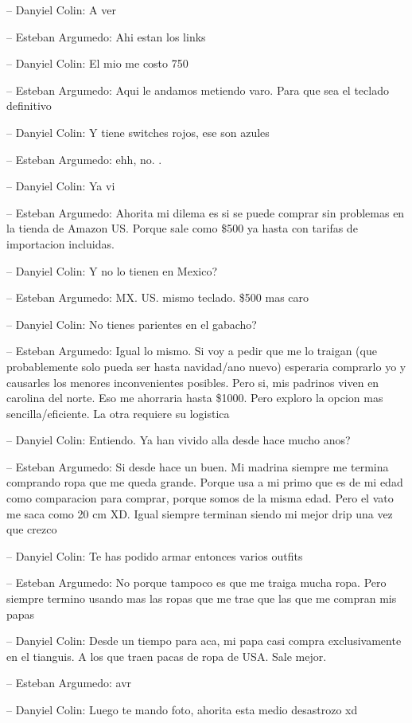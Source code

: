 -- Danyiel Colin: A ver

-- Esteban Argumedo: Ahi estan los links

-- Danyiel Colin: El mio me costo 750

-- Esteban Argumedo: Aqui le andamos metiendo varo. Para que sea el
teclado definitivo

-- Danyiel Colin: Y tiene switches rojos, ese son azules

-- Esteban Argumedo: ehh, no. .

-- Danyiel Colin: Ya vi

-- Esteban Argumedo: Ahorita mi dilema es si se puede comprar sin
problemas en la tienda de Amazon US. Porque sale como \$500 ya hasta con
tarifas de importacion incluidas.

-- Danyiel Colin: Y no lo tienen en Mexico?

-- Esteban Argumedo: MX. US. mismo teclado. \$500 mas caro

-- Danyiel Colin: No tienes parientes en el gabacho?

-- Esteban Argumedo: Igual lo mismo. Si voy a pedir que me lo traigan
(que probablemente solo pueda ser hasta navidad/ano nuevo) esperaria
comprarlo yo y causarles los menores inconvenientes posibles. Pero si,
mis padrinos viven en carolina del norte. Eso me ahorraria hasta \$1000.
Pero exploro la opcion mas sencilla/eficiente. La otra requiere su
logistica

-- Danyiel Colin: Entiendo. Ya han vivido alla desde hace mucho anos?

-- Esteban Argumedo: Si desde hace un buen. Mi madrina siempre me
termina comprando ropa que me queda grande. Porque usa a mi primo que es
de mi edad como comparacion para comprar, porque somos de la misma edad.
Pero el vato me saca como 20 cm XD. Igual siempre terminan siendo mi
mejor drip una vez que crezco

-- Danyiel Colin: Te has podido armar entonces varios outfits

-- Esteban Argumedo: No porque tampoco es que me traiga mucha ropa. Pero
siempre termino usando mas las ropas que me trae que las que me compran
mis papas

-- Danyiel Colin: Desde un tiempo para aca, mi papa casi compra
exclusivamente en el tianguis. A los que traen pacas de ropa de USA.
Sale mejor.

-- Esteban Argumedo: avr

-- Danyiel Colin: Luego te mando foto, ahorita esta medio desastrozo xd

